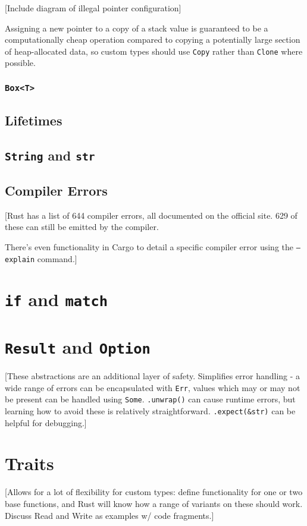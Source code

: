 \documentclass{l4proj}
\begin{document}
[Include diagram of illegal pointer configuration]

Assigning a new pointer to a copy of a stack value is guaranteed to be a computationally cheap operation compared to copying a potentially large section of heap-allocated data, so custom types should use \texttt{Copy} rather than \texttt{Clone} where possible.

\subsubsection{\texttt{Box<T>}}

\subsection{Lifetimes}

\subsection{\texttt{String} and \texttt{str}}

\subsection{Compiler Errors}
[Rust has a list of 644 compiler errors, all documented on the official site.\cite{compiler-error-list} 629 of these can still be emitted by the compiler.

There's even functionality in Cargo to detail a specific compiler error using the \texttt{--explain} command.]

\section{\texttt{if} and \texttt{match}}

\section{\texttt{Result} and \texttt{Option}}
[These abstractions are an additional layer of safety. Simplifies error handling - a wide range of errors can be encapsulated with \texttt{Err}, values which may or may not be present can be handled using \texttt{Some}. \texttt{.unwrap()} can cause runtime errors, but learning how to avoid these is relatively straightforward. \texttt{.expect(\&str)} can be helpful for debugging.]

\section{Traits}
[Allows for a lot of flexibility for custom types: define functionality for one or two base functions, and Rust will know how a range of variants on these should work. Discuss Read and Write as examples w/ code fragments.]
\end{document}
